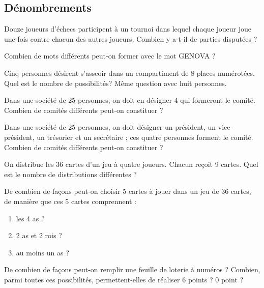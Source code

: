 \subsection{Dénombrements}

\begin{exercice}
Douze joueurs d’échecs participent à un tournoi dans lequel chaque joueur joue une fois contre chacun des autres joueurs. Combien y a-t-il de parties disputées ?
\end{exercice}

\begin{exercice}
Combien de mots différents peut-on former avec le mot GENOVA ?
\end{exercice}

\begin{exercice}
Cinq personnes désirent s’asseoir dans un compartiment de 8 places numérotées. Quel est le nombre de possibilités?
Même question avec huit personnes.
\end{exercice}

\begin{exercice}
Dans une société de 25 personnes, on doit en désigner 4 qui formeront le comité. Combien de comités différents peut-on constituer ?
\end{exercice}

\begin{exercice}
Dans une société de 25 personnes, on doit désigner un président, un vice-président, un trésorier et un secrétaire ; ces quatre personnes forment le comité. Combien de comités différents peut-on constituer ?
\end{exercice}

\begin{exercice}
On distribue les 36 cartes d’un jeu à quatre joueurs. Chacun reçoit 9 cartes. Quel est le nombre de distributions différentes ?
\end{exercice}

\begin{exercice}
De combien de façons peut-on choisir 5 cartes à jouer dans un jeu de 36 cartes, de manière que ces 5 cartes comprennent :
\begin{enumerate}
\item les 4 as ?
\item 2 as et 2 rois ?
\item au moins un as ?
\end{enumerate}
\end{exercice}

\begin{exercice}
De combien de façons peut-on remplir une feuille de loterie à numéros ?
Combien, parmi toutes ces possibilités, permettent-elles de réaliser 6 points ? 0 point ?
\end{exercice}

